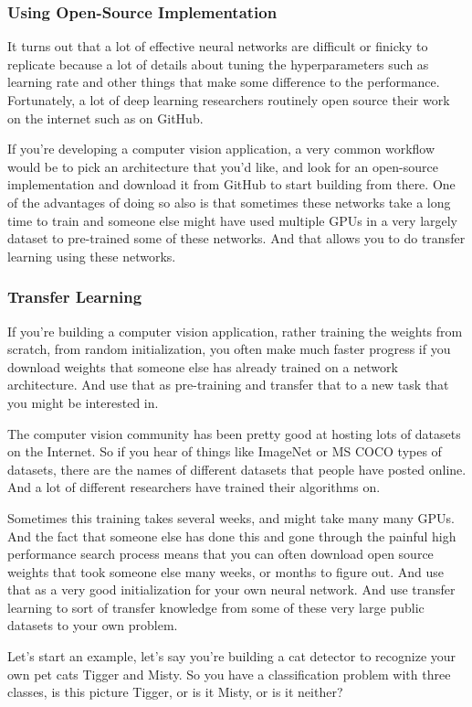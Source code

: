 \documentclass[UTF8]{article}
\begin{document}
\subsubsection{Using Open-Source Implementation}
It turns out that a lot of effective neural networks are difficult or finicky to replicate because
a lot of details about tuning the hyperparameters such as learning rate and other things that make
some difference to the performance. Fortunately, a lot of deep learning researchers routinely open
source their work on the internet such as on GitHub.

If you're developing a computer vision application, a very common workflow would be to pick an
architecture that you'd like, and look for an open-source implementation and download it from
GitHub to start building from there. One of the advantages of doing so also is that sometimes these
networks take a long time to train and someone else might have used multiple GPUs in a very largely
dataset to pre-trained some of these networks. And that allows you to do transfer learning using
these networks.

\subsubsection{Transfer Learning}
If you're building a computer vision application, rather training the weights from scratch, from
random initialization, you often make much faster progress if you download weights that someone
else has already trained on a network architecture. And use that as pre-training and transfer that
to a new task that you might be interested in.

The computer vision community has been pretty good at hosting lots of datasets on the Internet. So
if you hear of things like ImageNet or MS COCO types of datasets, there are the names of different
datasets that people have posted online. And a lot of different researchers have trained their
algorithms on.

Sometimes this training takes several weeks, and might take many many GPUs. And the fact that
someone else has done this and gone through the painful high performance search process means that
you can often download open source weights that took someone else many weeks, or months to figure
out. And use that as a very good initialization for your own neural network. And use transfer
learning to sort of transfer knowledge from some of these very large public datasets to your own
problem.

Let's start an example, let's say you're building a cat detector to recognize your own pet cats
Tigger and Misty. So you have a classification problem with three classes, is this picture Tigger,
or is it Misty, or is it neither?
\end{document}
